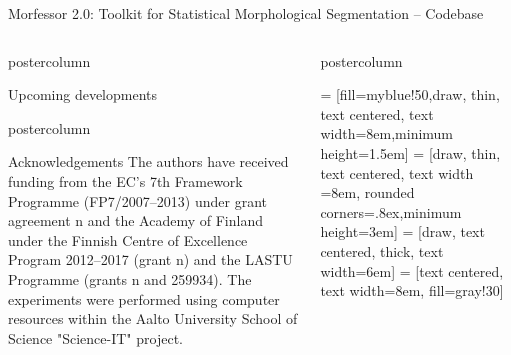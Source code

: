 \documentclass[final]{beamer} %
\begin{document}
\begin{frame}{Morfessor 2.0: Toolkit for Statistical Morphological Segmentation -- Codebase}
\begin{columns}
\begin{column}{.3\textwidth}
\begin{beamercolorbox}[center,wd=\textwidth]{postercolumn}
\begin{block}{Upcoming developments}
\begin{itemize}
\end{itemize}
            \end{block}
            
	\end{beamercolorbox}
	  \begin{beamercolorbox}[center,wd=\textwidth]{postercolumn}
	 \begin{block}{Acknowledgements}
\footnotesize
The authors have received funding from the
EC's 7th Framework Programme (FP7/2007--2013)
under
grant agreement n and the Academy of Finland under
the Finnish Centre of Excellence Program 2012--2017 (grant
n) and the LASTU Programme (grants n and 259934). 
The experiments were performed using computer resources within the Aalto University School of Science "Science-IT" project.    
	            \end{block}
	            
		\end{beamercolorbox}


\end{column}
\begin{column}{.35\textwidth}


  \begin{beamercolorbox}[center,wd=\textwidth]{postercolumn}
 \begin{block}{}
 = [fill=myblue!50,draw, thin, text centered, text width=8em,minimum height=1.5em]
 = [draw, thin, text centered, text width =8em, rounded corners=.8ex,minimum height=3em]
 = [draw, text centered, thick, text width=6em]
 = [text centered, text width=8em, fill=gray!30]


\end{block}
\end{beamercolorbox}
\end{column}
\end{columns}
\end{frame}
\end{document}
